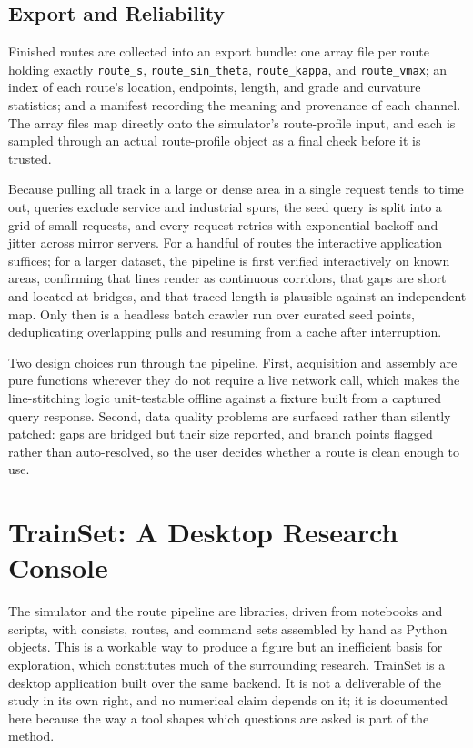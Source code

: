 \documentclass[numbered]{trbunofficial}
\begin{document}
\subsection{Export and Reliability}

Finished routes are collected into an export bundle: one array file per route holding exactly \texttt{route\_s}, \texttt{route\_sin\_theta}, \texttt{route\_kappa}, and \texttt{route\_vmax}; an index of each route's location, endpoints, length, and grade and curvature statistics; and a manifest recording the meaning and provenance of each channel. The array files map directly onto the simulator's route-profile input, and each is sampled through an actual route-profile object as a final check before it is trusted.

Because pulling all track in a large or dense area in a single request tends to time out, queries exclude service and industrial spurs, the seed query is split into a grid of small requests, and every request retries with exponential backoff and jitter across mirror servers. For a handful of routes the interactive application suffices; for a larger dataset, the pipeline is first verified interactively on known areas, confirming that lines render as continuous corridors, that gaps are short and located at bridges, and that traced length is plausible against an independent map. Only then is a headless batch crawler run over curated seed points, deduplicating overlapping pulls and resuming from a cache after interruption.

Two design choices run through the pipeline. First, acquisition and assembly are pure functions wherever they do not require a live network call, which makes the line-stitching logic unit-testable offline against a fixture built from a captured query response. Second, data quality problems are surfaced rather than silently patched: gaps are bridged but their size reported, and branch points flagged rather than auto-resolved, so the user decides whether a route is clean enough to use.

\section{TrainSet: A Desktop Research Console}\label{sec:trainset}

The simulator and the route pipeline are libraries, driven from notebooks and scripts, with consists, routes, and command sets assembled by hand as Python objects. This is a workable way to produce a figure but an inefficient basis for exploration, which constitutes much of the surrounding research. TrainSet is a desktop application built over the same backend. It is not a deliverable of the study in its own right, and no numerical claim depends on it; it is documented here because the way a tool shapes which questions are asked is part of the method.
\end{document}
